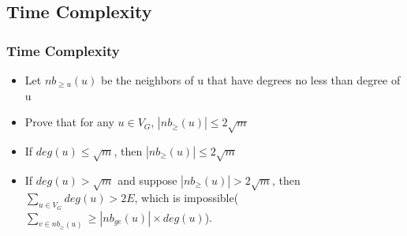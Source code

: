 \documentclass{beamer}
\begin{document}

\subsection{Time Complexity}
\begin{frame}
\frametitle{Time Complexity}

\begin{itemize}
	\item Let $nb_{\ge u}(u)$ be the neighbors of u that have degrees no less than degree of u
	\item Prove that for any $u\in V_{G}$, $|nb_{\ge}(u)|\le 2\sqrt{m}$
	\item If $deg(u)\le \sqrt{m}$, then $|nb_{\ge}(u)|\le 2\sqrt{m}$
	\item If  $deg(u)> \sqrt{m}$ and suppose $|nb_{\ge}(u)|> 2\sqrt{m}$, then $\sum_{u\in V_{G}} deg(u) > 2E$, which is impossible($\sum_{v\in nb_{\ge}(u)} \ge |nb_{ge}(u)|\times deg(u)$).

\end{itemize}

\end{frame}
\end{document}
